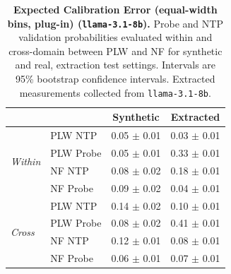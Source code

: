 \begin{table}[ht]
\centering
\begin{tabular}{ll cc}
\toprule
& & Synthetic & Extracted \\
\midrule
\multirow{4}{*}{\textit{Within}}
& PLW NTP & 0.05 $\pm$ 0.01 & 0.03 $\pm$ 0.01 \\
& PLW Probe & 0.05 $\pm$ 0.01 & 0.33 $\pm$ 0.01 \\
& NF NTP & 0.08 $\pm$ 0.02 & 0.18 $\pm$ 0.01 \\
& NF Probe & 0.09 $\pm$ 0.02 & 0.04 $\pm$ 0.01 \\
\midrule
\multirow{4}{*}{\textit{Cross}}
& PLW NTP & 0.14 $\pm$ 0.02 & 0.10 $\pm$ 0.01 \\
& PLW Probe & 0.08 $\pm$ 0.02 & 0.41 $\pm$ 0.01 \\
& NF NTP & 0.12 $\pm$ 0.01 & 0.08 $\pm$ 0.01 \\
& NF Probe & 0.06 $\pm$ 0.01 & 0.07 $\pm$ 0.01 \\
\bottomrule
\end{tabular}
\caption{\textbf{Expected Calibration Error (equal-width bins, plug-in) (\texttt{llama-3.1-8b}).} Probe and NTP validation probabilities evaluated within and cross-domain between PLW and NF for synthetic and real, extraction test settings. Intervals are 95\% bootstrap confidence intervals. Extracted measurements collected from \texttt{llama-3.1-8b}.}
\label{tab:llama-3.1-8b-llama-3.1-8b-pond_nfix-ece}
\end{table}
